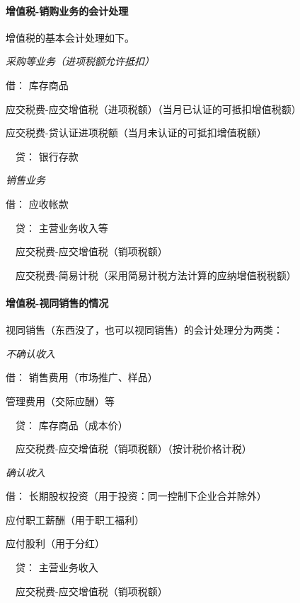 \documentclass[UTF8,12pt]{ctexart}
\newenvironment{Dr}{\noindent 借：}{\par}
\newenvironment{Cr}{\noindent \ \ 贷：}{\par}
\numberwithin{equation}{section} %
\numberwithin{figure}{section}
\numberwithin{table}{section}
\begin{document}
	\paragraph{增值税-销购业务的会计处理}
	增值税的基本会计处理如下。
	
	\textit{采购等业务（进项税额允许抵扣）}
	
	\begin{Dr}
		库存商品
		
		应交税费-应交增值税（进项税额）（当月已认证的可抵扣增值税额）
		
		应交税费-贷认证进项税额（当月未认证的可抵扣增值税额）
	\end{Dr}
	\begin{Cr}
		银行存款
	\end{Cr}
	
	\textit{销售业务}
	
	\begin{Dr}
		应收帐款
	\end{Dr}
	\begin{Cr}
		主营业务收入等
		
		\ \ 应交税费-应交增值税（销项税额）
		
		\ \ 应交税费-简易计税（采用简易计税方法计算的应纳增值税税额）
	\end{Cr}
	
	\paragraph{增值税-视同销售的情况}视同销售（东西没了，也可以视同销售）的会计处理分为两类：
	
	\textit{不确认收入}
	
	\begin{Dr}
		销售费用（市场推广、样品）
		
		管理费用（交际应酬）等
	\end{Dr}
	\begin{Cr}
		库存商品（成本价）
		
		\ \ 应交税费-应交增值税（销项税额）（按计税价格计税）
	\end{Cr}

	
	\textit{确认收入}
	
	\begin{Dr}
		长期股权投资（用于投资：同一控制下企业合并除外）
		
		应付职工薪酬（用于职工福利）
		
		应付股利（用于分红）
	\end{Dr}
	\begin{Cr}
		主营业务收入
		
		\ \ 应交税费-应交增值税（销项税额）
	\end{Cr}
	
\end{document}
